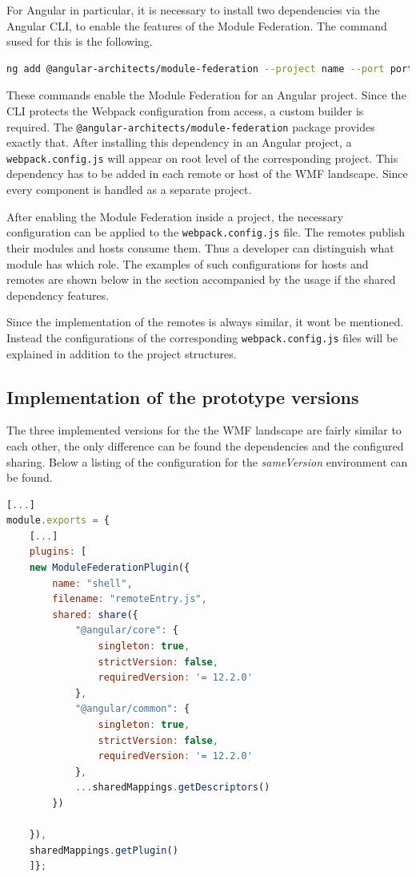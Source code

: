 For Angular in particular, it is necessary to install two dependencies via the Angular CLI, to enable the features of the Module Federation. The command sused for this is the following. 

\begin{lstlisting}[language=Bash, caption=Angular CLI console command to enable Module Federation in an Angular project, label=angluar_wmf_command]
ng add @angular-architects/module-federation --project name --port port
\end{lstlisting}

These commands enable the Module Federation for an Angular project. Since the CLI protects the Webpack configuration from access, a custom builder is required. The \texttt{@angular-architects/module-federation} package provides exactly that.
After installing this dependency in an Angular project, a \texttt{webpack.config.js} will appear on root level of the corresponding project.\cite{wmf_angular_dependency_install}
This dependency has to be added in each remote or host of the WMF landscape. Since every component is handled as a separate project.

After enabling the Module Federation inside a project, the necessary configuration can be applied to the \texttt{webpack.config.js} file. The remotes publish their modules and hosts consume them. Thus a developer can distinguish what module has which role.
The examples of such configurations for hosts and remotes are shown below in the section accompanied by the usage if the shared dependency features.

Since the implementation of the remotes is always similar, it wont be mentioned. Instead the configurations of the corresponding \texttt{webpack.config.js} files will be explained in addition to the project structures.

\subsection{Implementation of the prototype versions}

The three implemented versions for the the WMF landscape are fairly similar to each other, the only difference can be found the dependencies and the configured sharing. Below a listing of the configuration for the \textit{sameVersion} environment can be found.

\begin{lstlisting}[language=JavaScript, caption=Content of \texttt{webpack.config.js} of the shell of the same versions WMF project, label=wmf_sameversions_shell]
[...]
module.exports = {
	[...]
	plugins: [
	new ModuleFederationPlugin({
		name: "shell",
		filename: "remoteEntry.js",
		shared: share({
			"@angular/core": { 
				singleton: true, 
				strictVersion: false, 
				requiredVersion: '= 12.2.0'
			},
			"@angular/common": { 
				singleton: true, 
				strictVersion: false, 
				requiredVersion: '= 12.2.0' 
			},
			...sharedMappings.getDescriptors()
		})
		
	}),
	sharedMappings.getPlugin()
	]};
\end{lstlisting}

